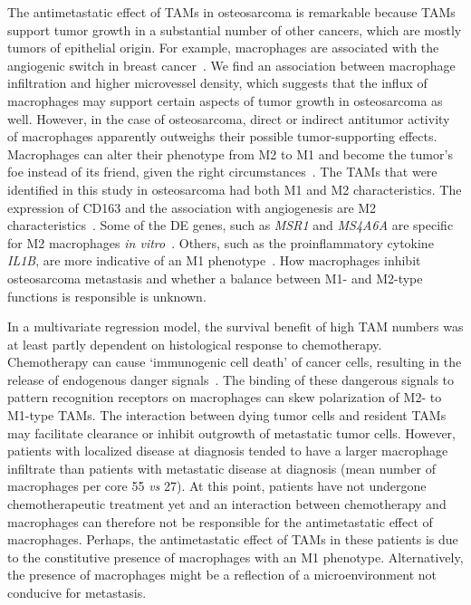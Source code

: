 The antimetastatic effect of TAMs in osteosarcoma is
remarkable because TAMs support tumor growth in a
substantial number of other cancers, which are mostly
tumors of epithelial origin. For example, macrophages
are associated with the angiogenic switch in breast cancer~\cite{lin2006macrophages}. We find an association between macrophage infiltration
and higher microvessel density, which suggests that
the influx of macrophages may support certain aspects of
tumor growth in osteosarcoma as well. However, in the
case of osteosarcoma, direct or indirect antitumor activity
of macrophages apparently outweighs their possible
tumor\hyp{}supporting effects. Macrophages can alter their phenotype
from M2 to M1 and become the tumor's foe instead
of its friend, given the right circumstances~\cite{hagemann2008re,sinha2005reduction,buhtoiarov2006macrophages}. The
TAMs that were identified in this study in osteosarcoma
had both M1 and M2 characteristics. The expression of
CD163 and the association with angiogenesis are M2
characteristics~\cite{lin2006macrophages,ojalvo2009high}. Some of the DE genes, such as
{\it MSR1} and {\it MS4A6A} are specific for M2 macrophages {\it in vitro}~\cite{martinez2006transcriptional}. Others, such as the proinflammatory cytokine {\it IL1B},
are more indicative of an M1 phenotype~\cite{mosser2008exploring}. How macrophages
inhibit osteosarcoma metastasis and whether a
balance between M1- and M2-type functions is responsible
is unknown.

In a multivariate regression model, the survival benefit
of high TAM numbers was at least partly dependent on
histological response to chemotherapy. Chemotherapy
can cause `immunogenic cell death' of cancer cells,
resulting in the release of endogenous danger signals~\cite{zitvogel2008immunological,kono2008dying}. The binding of these dangerous signals to
pattern recognition receptors on macrophages can skew
polarization of M2- to M1-type TAMs. The interaction
between dying tumor cells and resident TAMs may facilitate
clearance or inhibit outgrowth of metastatic tumor
cells. However, patients with localized disease at diagnosis
tended to have a larger macrophage infiltrate than
patients with metastatic disease at diagnosis (mean number
of macrophages per core 55 {\it vs} 27). At this point,
patients have not undergone chemotherapeutic treatment
yet and an interaction between chemotherapy and macrophages
can therefore not be responsible for the antimetastatic
effect of macrophages. Perhaps, the antimetastatic
effect of TAMs in these patients is due to the constitutive
presence of macrophages with an M1 phenotype. Alternatively,
the presence of macrophages might be a
reflection of a microenvironment not conducive for
metastasis.

